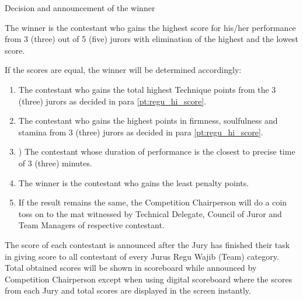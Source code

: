 \begin{legal}
\item Decision and announcement of the winner
    \begin{legal}
    \item  \label{pt:regu_hi_score} The winner is the contestant who gains the highest score for his/her performance from 3 (three) out of 5 (five) jurors with elimination of the highest and the lowest score.
    \item If the scores are equal, the winner will be determined accordingly:
            \begin{enumerate}[label*=\roman*.]
            \item The contestant who gains the total highest Technique points from the 3 (three) jurors as decided in para \ref{pt:regu_hi_score}.
            \item The contestant who gains the highest points in firmness, soulfulness and stamina from 3 (three) jurors as decided in para \ref{pt:regu_hi_score}.
            \item ) The contestant whose duration of performance is the closest to precise time of 3 (three) minutes.
            \item The winner is the contestant who gains the least penalty points.
            \item If the result remains the same, the Competition Chairperson will do a coin toss on to the mat witnessed by Technical Delegate, Council of Juror and Team Managers of respective contestant.
            \end{enumerate}

    \item The score of each contestant is announced after the Jury has finished their task in giving score to all contestant of every Jurus Regu Wajib (Team) category. Total obtained scores will be shown in scoreboard while announced by Competition Chairperson except when using digital scoreboard where the scores from each Jury and total scores are displayed in the screen instantly.
    \end{legal}
\end{legal} %


